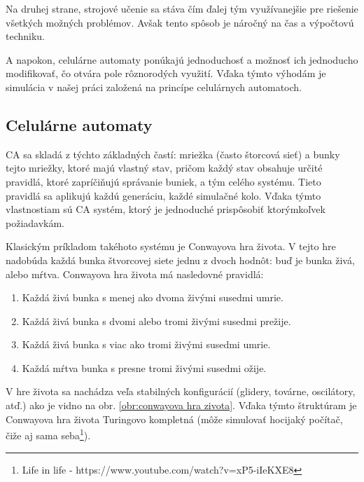 \documentclass[12pt]{article}
\begin{document}
Na druhej strane, strojové učenie sa stáva čím ďalej tým využívanejšie pre
riešenie všetkých možných problémov. Avšak tento spôsob je náročný na čas
a výpočtovú techniku.

A napokon, celulárne automaty ponúkajú jednoduchosť a možnosť ich jednoducho
modifikovať, čo otvára pole rôznorodých využití. Vďaka týmto výhodám je simulácia
v našej práci založená na princípe celulárnych automatoch.

\subsection{Celulárne automaty}

CA sa skladá z týchto základných častí: mriežka (často štorcová sieť)
a bunky tejto mriežky, ktoré majú vlastný stav, pričom každý stav obsahuje
určité pravidlá, ktoré zapríčiňujú správanie buniek, a tým celého systému.
Tieto pravidlá sa aplikujú každú generáciu, každé simulačné kolo.
Vďaka týmto vlastnostiam sú CA systém, ktorý je jednoduché prispôsobiť ktorýmkoľvek
požiadavkám.

Klasickým príkladom takéhoto systému je Conwayova hra života. \cite{wiki:Conway's_Game_of_Life}
V tejto hre nadobúda každá bunka štvorcovej siete jednu z dvoch hodnôt:
buď je bunka živá, alebo mŕtva. Conwayova hra života má nasledovné pravidlá:

\begin{enumerate}
	\item Každá živá bunka s menej ako dvoma živými susedmi umrie.
	\item Každá živá bunka s dvomi alebo tromi živými susedmi prežije.
	\item Každá živá bunka s viac ako tromi živými susedmi umrie.
	\item Každá mŕtva bunka s presne tromi živými susedmi ožije.
\end{enumerate}

V hre života sa nachádza veľa stabilných konfigurácií (glidery, továrne,
oscilátory, atď.) ako je vidno na obr. \ref{obr:conwayova hra zivota}.
Vďaka týmto štruktúram je Conwayova hra života Turingovo kompletná (môže
simulovať hocijaký počítač, čiže aj sama seba\footnote
{Life in life - https://www.youtube.com/watch?v=xP5-iIeKXE8}).
\end{document}

